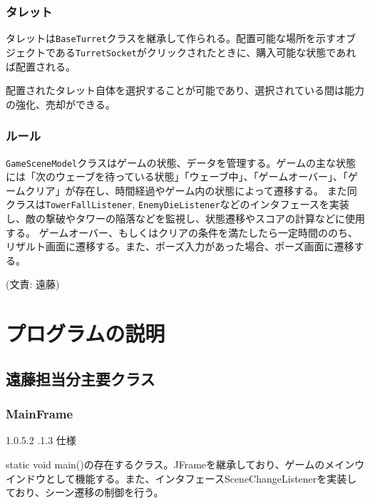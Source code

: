 \documentclass[11pt,a4j]{jarticle}
\makeatletter
\newcommand{\subsubsubsection}{\@startsection{paragraph}{4}{\z@}%
    {1.0\Cvs \@plus.5\Cdp \@minus.2\Cdp}%
    {.1\Cvs \@plus.3\Cdp}%
    {\reset@font\normalsize\bf}
}
\makeatother
\begin{document}
\subsubsection{タレット}

タレットは\verb|BaseTurret|クラスを継承して作られる。配置可能な場所を示すオブジェクトである\verb|TurretSocket|がクリックされたときに、購入可能な状態であれば配置される。

配置されたタレット自体を選択することが可能であり、選択されている間は能力の強化、売却ができる。

\subsubsection{ルール}

\verb|GameSceneModel|クラスはゲームの状態、データを管理する。ゲームの主な状態には「次のウェーブを待っている状態」「ウェーブ中」、「ゲームオーバー」、「ゲームクリア」が存在し、時間経過やゲーム内の状態によって遷移する。
また同クラスは\verb|TowerFallListener|, \verb|EnemyDieListener|などのインタフェースを実装し、敵の撃破やタワーの陥落などを監視し、状態遷移やスコアの計算などに使用する。
ゲームオーバー、もしくはクリアの条件を満たしたら一定時間ののち、リザルト画面に遷移する。また、ポーズ入力があった場合、ポーズ画面に遷移する。

(文責: 遠藤)

\section{プログラムの説明}


\subsection{遠藤担当分主要クラス}

\subsubsection{MainFrame}

\subsubsubsection{仕様}

static void main()の存在するクラス。JFrameを継承しており、ゲームのメインウインドウとして機能する。また、インタフェースSceneChangeListenerを実装しており、シーン遷移の制御を行う。
\end{document}
